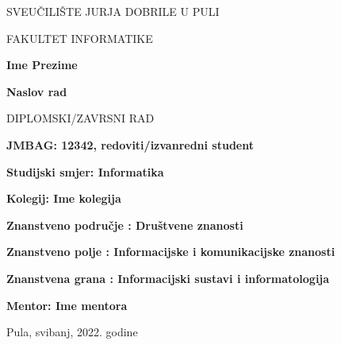 \begin{center}
SVEUČILIŠTE JURJA DOBRILE U PULI 

FAKULTET INFORMATIKE

\vspace{45mm} 

\textbf{Ime Prezime}

\vspace{20mm} 

\textbf{Naslov rad}

\vspace{5mm}
DIPLOMSKI/ZAVRSNI RAD

\end{center}

\vspace{45mm}

\textbf{JMBAG: 12342, redoviti/izvanredni student}

\textbf{Studijski smjer: Informatika}
\bigskip

\textbf{Kolegij: Ime kolegija}

\textbf{Znanstveno područje : Društvene znanosti}

\textbf{Znanstveno polje : Informacijske i komunikacijske znanosti}

\textbf{Znanstvena grana : Informacijski sustavi i informatologija}
\bigskip

\textbf{Mentor: Ime mentora}

\vfill

\begin{center}

Pula, svibanj, 2022. godine

\end{center}